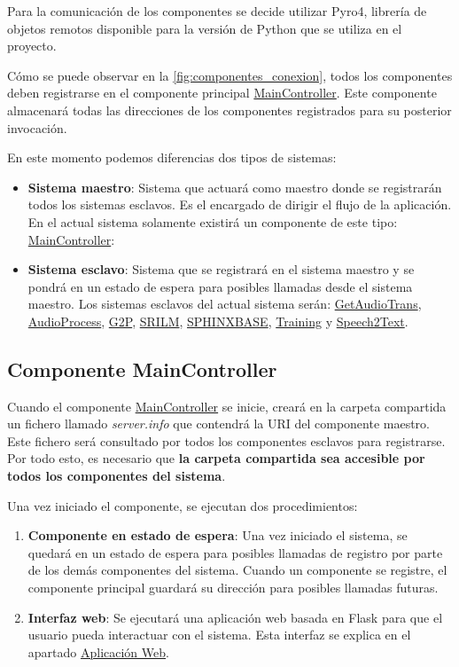 \documentclass[../main.tex]{subfiles}
\begin{document}
Para la comunicación de los componentes se decide utilizar Pyro4, librería de objetos remotos disponible para la versión de Python que se utiliza en el proyecto.

Cómo se puede observar en la \autoref{fig:componentes_conexion}, todos los componentes deben registrarse en el componente principal \hyperref[par:maincontroller]{MainController}. Este componente almacenará todas las direcciones de los componentes registrados para su posterior invocación.

En este momento podemos diferencias dos tipos de sistemas:
\begin{itemize}
    \item \textbf{Sistema maestro}: Sistema que actuará como maestro donde se registrarán todos los sistemas esclavos. Es el encargado de dirigir el flujo de la aplicación. En el actual sistema solamente existirá un componente de este tipo: \hyperref[par:maincontroller]{MainController}: 
    \item \textbf{Sistema esclavo}: Sistema que se registrará en el sistema maestro y se pondrá en un estado de espera para posibles llamadas desde el sistema maestro. Los sistemas esclavos del actual sistema serán: \hyperref[par:getaudiotrans]{GetAudioTrans}, \hyperref[par:audioprocess]{AudioProcess}, \hyperref[par:g2p]{G2P}, \hyperref[par:srilm]{SRILM}, \hyperref[par:sphinxbase]{SPHINXBASE}, \hyperref[par:training]{Training} y \hyperref[par:speech2text]{Speech2Text}.
\end{itemize}

\subsection{Componente MainController}\label{subsec:impl_maincontroller}
Cuando el componente \hyperref[par:maincontroller]{MainController} se inicie, creará en la carpeta compartida un fichero llamado \textit{server.info} que contendrá la URI del componente maestro. Este fichero será consultado por todos los componentes esclavos para registrarse. Por todo esto, es necesario que \textbf{la carpeta compartida sea accesible por todos los componentes del sistema}.

Una vez iniciado el componente, se ejecutan dos procedimientos:
\begin{enumerate}
    \item \textbf{Componente en estado de espera}: Una vez iniciado el sistema, se quedará en un estado de espera para posibles llamadas de registro por parte de los demás componentes del sistema. Cuando un componente se registre, el componente principal guardará su dirección para posibles llamadas futuras.
    \item \textbf{Interfaz web}: Se ejecutará una aplicación web basada en Flask para que el usuario pueda interactuar con el sistema. Esta interfaz se explica en el apartado \hyperref[subsubsec:aplicacionweb]{Aplicación Web}.
\end{enumerate}
\end{document}
